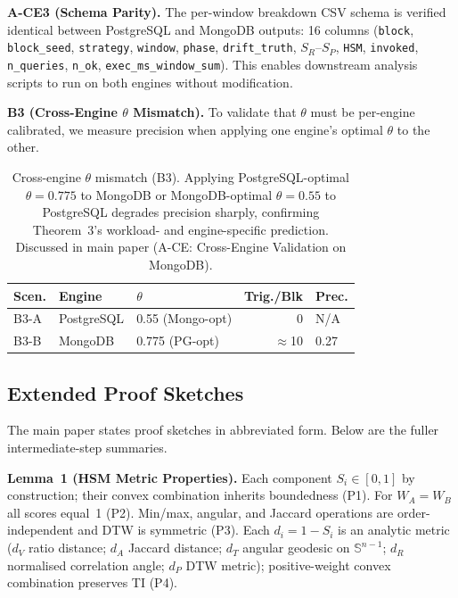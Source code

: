 \documentclass[10pt,twocolumn,a4paper]{article}
\newcommand{\SR}{S_{R}}
\newcommand{\SPER}{S_{P}}
\begin{document}
\textbf{A-CE3 (Schema Parity).}
The per-window breakdown CSV schema is verified identical between
PostgreSQL and MongoDB outputs: 16 columns
(\texttt{block}, \texttt{block\_seed}, \texttt{strategy},
\texttt{window}, \texttt{phase}, \texttt{drift\_truth},
$\SR$--$\SPER$, \texttt{HSM}, \texttt{invoked},
\texttt{n\_queries}, \texttt{n\_ok},
\texttt{exec\_ms\_window\_sum}).
This enables downstream analysis scripts to run on both engines
without modification.

\textbf{B3 (Cross-Engine $\theta$ Mismatch).}
To validate that $\theta$ must be per-engine calibrated, we measure precision when applying one engine's optimal $\theta$ to the other.
\begin{table}[h]\centering\footnotesize
\caption{Cross-engine $\theta$ mismatch (B3). Applying PostgreSQL-optimal $\theta\!=\!0.775$ to MongoDB or MongoDB-optimal $\theta\!=\!0.55$ to PostgreSQL degrades precision sharply, confirming Theorem~3's workload- and engine-specific prediction. Discussed in main paper (A-CE: Cross-Engine Validation on MongoDB).}
\setlength{\tabcolsep}{3pt}
\begin{tabular}{@{}lllrl@{}}
\toprule
\textbf{Scen.} & \textbf{Engine} & $\theta$ & \textbf{Trig./Blk} & \textbf{Prec.}\\
\midrule
B3-A & PostgreSQL & 0.55 (Mongo-opt)    & 0           & N/A\\
B3-B & MongoDB    & 0.775 (PG-opt)      & $\approx$10 & 0.27\\
\bottomrule
\end{tabular}
\label{tab:cross-engine-theta}
\end{table}

\subsection{Extended Proof Sketches}

The main paper states proof sketches in abbreviated form.
Below are the fuller intermediate-step summaries.

\textbf{Lemma~1 (HSM Metric Properties).}
Each component $S_i\in[0,1]$ by construction; their convex combination
inherits boundedness (P1). For $W_A\!=\!W_B$ all scores equal~1 (P2).
Min/max, angular, and Jaccard operations are order-independent and
DTW is symmetric (P3). Each $d_i\!=\!1-S_i$ is an analytic metric
($d_V$ ratio distance; $d_A$ Jaccard distance; $d_T$ angular geodesic
on $\mathbb{S}^{n-1}$; $d_R$ normalised correlation angle; $d_P$ DTW
metric); positive-weight convex combination preserves TI (P4).
\end{document}
